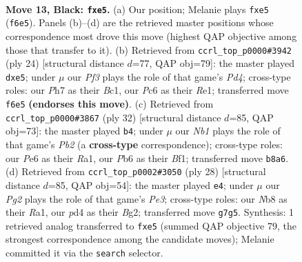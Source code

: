 \documentclass[11pt]{article}
\begin{document}
\clearpage

\begin{figure}[p]\centering
\begin{subfigure}{0.46\textwidth}\centering
\resizebox{\linewidth}{!}{%
\newchessgame
\chessboard[
  setfen={rnb1r2k/p2nq1pp/1pp1pp2/3pP3/3P4/2N5/PPPQ1PPP/2K1RBNR b - - 1 13},
  showmover=false,
  pgfstyle=straightmove, color=movearrow, markmove={f6-e5}
]}
\caption{}
\end{subfigure}\hfill
\begin{subfigure}{0.46\textwidth}\centering
\resizebox{\linewidth}{!}{%
\newchessgame
\chessboard[
  setfen={r1bqr1k1/2p2pp1/1bpp1n1p/p3p3/3PP3/2P2N1P/PPQN1PP1/R1B1R1K1 w - - 0 13},
  showmover=false,
  pgfstyle=straightmove, color=movearrow, markmove={d4-e5}
]}
\caption{}
\end{subfigure}
\\[4pt]
\begin{subfigure}{0.46\textwidth}\centering
\resizebox{\linewidth}{!}{%
\newchessgame
\chessboard[
  setfen={r2qr1k1/1ppb1ppn/3p2np/p3p3/P2PP3/2P1RN1P/1PQN1PP1/R4BK1 w - - 7 17},
  showmover=false,
  pgfstyle=straightmove, color=movearrow, markmove={b2-b4}
]}
\caption{}
\end{subfigure}\hfill
\begin{subfigure}{0.46\textwidth}\centering
\resizebox{\linewidth}{!}{%
\newchessgame
\chessboard[
  setfen={rn3rk1/p2bqpp1/3p1n2/1p2p2p/3P3P/1PN1PPP1/P2QN1B1/R4RK1 w - - 0 15},
  showmover=false,
  pgfstyle=straightmove, color=movearrow, markmove={e3-e4}
]}
\caption{}
\end{subfigure}
\caption{\textbf{Move 13, Black: \texttt{fxe5}.} (a) Our position; Melanie plays \texttt{fxe5} (\texttt{f6e5}). Panels (b)--(d) are the retrieved master positions whose correspondence most drove this move (highest QAP objective among those that transfer to it). (b) Retrieved from \texttt{ccrl\_top\_p0000\#3942} (ply 24) [structural distance $d$=77, QAP obj=79]: the master played \texttt{dxe5}; under $\mu$ our \emph{Pf3} plays the role of that game's \emph{Pd4}; cross-type roles: our \emph{P}h7 as their \emph{B}c1, our \emph{P}c6 as their \emph{R}e1; transferred move \texttt{f6e5} \textbf{(endorses this move)}. (c) Retrieved from \texttt{ccrl\_top\_p0000\#3867} (ply 32) [structural distance $d$=85, QAP obj=73]: the master played \texttt{b4}; under $\mu$ our \emph{Nb1} plays the role of that game's \emph{Pb2} (a \textbf{cross-type} correspondence); cross-type roles: our \emph{P}e6 as their \emph{R}a1, our \emph{P}b6 as their \emph{B}f1; transferred move \texttt{b8a6}. (d) Retrieved from \texttt{ccrl\_top\_p0002\#3050} (ply 28) [structural distance $d$=85, QAP obj=54]: the master played \texttt{e4}; under $\mu$ our \emph{Pg2} plays the role of that game's \emph{Pe3}; cross-type roles: our \emph{N}b8 as their \emph{R}a1, our \emph{p}d4 as their \emph{B}g2; transferred move \texttt{g7g5}. Synthesis: 1 retrieved analog transferred to \texttt{fxe5} (summed QAP objective 79, the strongest correspondence among the candidate moves); Melanie committed it via the \texttt{search} selector.}
\label{fig:thought-m25}
\end{figure}
\end{document}
